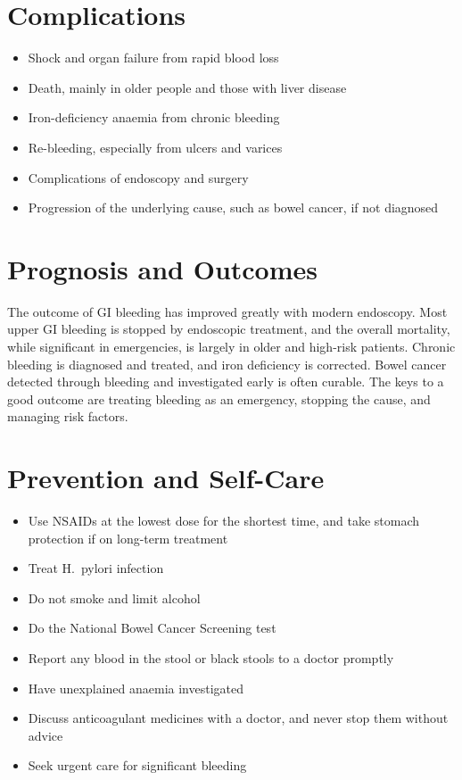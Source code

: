 \section*{Complications}
\begin{itemize}
    \item Shock and organ failure from rapid blood loss
    \item Death, mainly in older people and those with liver disease
    \item Iron-deficiency anaemia from chronic bleeding
    \item Re-bleeding, especially from ulcers and varices
    \item Complications of endoscopy and surgery
    \item Progression of the underlying cause, such as bowel cancer, if not diagnosed
\end{itemize}

\section*{Prognosis and Outcomes}
The outcome of GI bleeding has improved greatly with modern endoscopy. Most upper GI bleeding is stopped by endoscopic treatment, and the overall mortality, while significant in emergencies, is largely in older and high-risk patients. Chronic bleeding is diagnosed and treated, and iron deficiency is corrected. Bowel cancer detected through bleeding and investigated early is often curable. The keys to a good outcome are treating bleeding as an emergency, stopping the cause, and managing risk factors.

\section*{Prevention and Self-Care}
\begin{itemize}
    \item Use NSAIDs at the lowest dose for the shortest time, and take stomach protection if on long-term treatment
    \item Treat H.\ pylori infection
    \item Do not smoke and limit alcohol
    \item Do the National Bowel Cancer Screening test
    \item Report any blood in the stool or black stools to a doctor promptly
    \item Have unexplained anaemia investigated
    \item Discuss anticoagulant medicines with a doctor, and never stop them without advice
    \item Seek urgent care for significant bleeding
\end{itemize}

